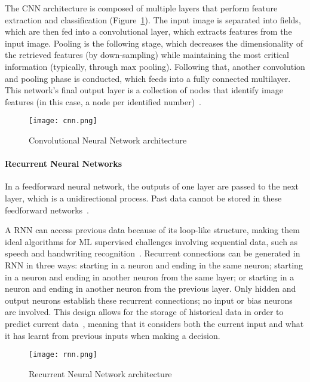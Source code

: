 The \gls{CNN} architecture is composed of multiple layers that perform feature extraction and classification (Figure~\ref{fig:cnn}). The input image is separated into fields, which are then fed into a convolutional layer, which extracts features from the input image. Pooling is the following stage, which decreases the dimensionality of the retrieved features (by down-sampling) while maintaining the most critical information (typically, through max pooling). Following that, another convolution and pooling phase is conducted, which feeds into a fully connected multilayer. This network's final output layer is a collection of nodes that identify image features (in this case, a node per identified number)~\cite{Madhavan2021DeepDeveloper}.

\begin{figure}[htbp]
    \centering
    \texttt{[image: cnn.png]}
    \caption{Convolutional Neural Network architecture~\cite{Madhavan2021DeepDeveloper}}
    \label{fig:cnn}
\end{figure}

\paragraph{Recurrent Neural Networks}

In a feedforward neural network, the outputs of one layer are passed to the next layer, which is a unidirectional process. Past data cannot be stored in these feedforward networks~\cite{Shewalkar2019PerformanceGRU}. 

A \gls{RNN} can access previous data because of its loop-like structure, making them ideal algorithms for \gls{ML} supervised challenges involving sequential data, such as speech and handwriting recognition~\cite{Ganatra2018ATools}. Recurrent connections can be generated in \gls{RNN} in three ways: starting in a neuron and ending in the same neuron; starting in a neuron and ending in another neuron from the same layer; or starting in a neuron and ending in another neuron from the previous layer. Only hidden and output neurons establish these recurrent connections; no input or bias neurons are involved. This design allows for the storage of historical data in order to predict current data~\cite{ShewalkarComparisonData}, meaning that it considers both the current input and what it has learnt from previous inputs when making a decision.

\begin{figure}[htbp]
    \centering
    \texttt{[image: rnn.png]}
    \caption{Recurrent Neural Network architecture~\cite{Gupta2017RecurrentLearning}}
    \label{fig:rnn}
\end{figure}

